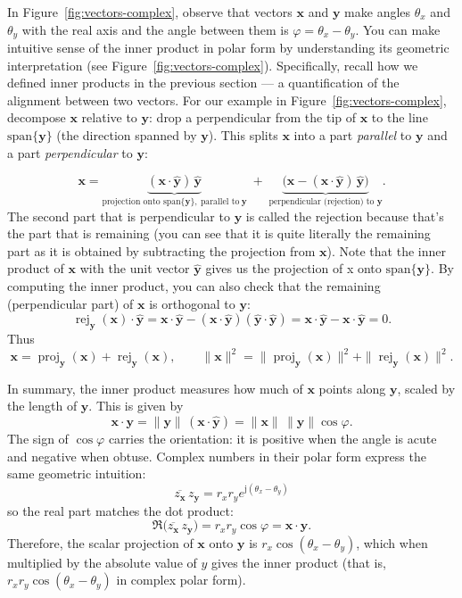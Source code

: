 \documentclass{ee102_notes}
\begin{document}
In Figure~\ref{fig:vectors-complex}, observe that vectors $\mathbf{x}$ and $\mathbf{y}$ make angles $\theta_x$ and $\theta_y$ with the real axis and the angle between them is $\varphi=\theta_x-\theta_y$. You can make intuitive sense of the inner product in polar form by understanding its geometric interpretation (see Figure~\ref{fig:vectors-complex}). Specifically, recall how we defined inner products in the previous section --- a quantification of the alignment between two vectors. For our example in Figure~\ref{fig:vectors-complex}, decompose $\mathbf{x}$ relative to $\mathbf{y}$: drop a perpendicular from the tip of $\mathbf{x}$ to the line $\mathrm{span}\{\mathbf{y}\}$ (the direction spanned by $\mathbf{y}$). This splits $\mathbf{x}$ into a part \emph{parallel} to $\mathbf{y}$ and a part \emph{perpendicular} to $\mathbf{y}$:
   
\[
\mathbf{x}
=\underbrace{(\mathbf{x}\cdot\hat{\mathbf{y}})\,\hat{\mathbf{y}}}_{\text{projection onto }\mathrm{span}\{\mathbf y\}, \: \text{parallel to} \: \mathbf y}
\;+\;
\underbrace{\Big(\mathbf{x}-(\mathbf{x}\cdot\hat{\mathbf{y}})\,\hat{\mathbf{y}}\Big)}_{\text{perpendicular (rejection) to }\mathbf y}.
\]
The second part that is perpendicular to $\mathbf y$ is called the rejection because that's the part that is remaining (you can see that it is quite literally the remaining part as it is obtained by subtracting the projection from $\mathbf{x}$). Note that the inner product of $\mathbf{x}$ with the unit vector $\hat{\mathbf{y}}$ gives us the projection of x onto $\mathrm{span}\{\mathbf{y}\}$. By computing the inner product, you can also check that the remaining (perpendicular part) of $\mathbf{x}$ is orthogonal to $\mathbf{y}$:
\[
\operatorname{rej}_{\mathbf y}(\mathbf x)\cdot \hat{\mathbf y}
=\mathbf x\!\cdot\!\hat{\mathbf y}-(\mathbf x\!\cdot\!\hat{\mathbf y})(\hat{\mathbf y}\!\cdot\!\hat{\mathbf y})
=\mathbf x\!\cdot\!\hat{\mathbf y}-\mathbf x\!\cdot\!\hat{\mathbf{y}}=0.
\]
Thus
\[
\mathbf x=\operatorname{proj}_{\mathbf y}(\mathbf x)+\operatorname{rej}_{\mathbf y}(\mathbf x),
\qquad
\|\mathbf x\|^2=\|\operatorname{proj}_{\mathbf y}(\mathbf x)\|^2+\|\operatorname{rej}_{\mathbf y}(\mathbf x)\|^2.
\]

In summary, the inner product measures how much of $\mathbf{x}$ points along $\mathbf{y}$, scaled by the length of $\mathbf{y}$. This is given by
    \[
      \mathbf{x}\cdot\mathbf{y}
      = \|\mathbf{y}\|\,(\mathbf{x}\cdot\hat{\mathbf{y}})
      = \|\mathbf{x}\|\,\|\mathbf{y}\|\cos\varphi.
    \]
The sign of $\cos\varphi$ carries the orientation: it is positive when the angle is acute and negative when obtuse. Complex numbers in their polar form express the same geometric intuition:
\[
      \overline{z_{\mathbf{x}}}\,z_{\mathbf{y}}
      = r_x r_y e^{\mathrm{j}(\theta_x-\theta_y)}
\]
so the real part matches the dot product:
\[
  \Re\!\big(\overline{z_{\mathbf{x}}}\,z_{\mathbf{y}}\big)
  = r_x r_y \cos\varphi
  = \mathbf{x}\cdot\mathbf{y}.
\]
Therefore, the scalar projection of $\textbf{x}$ onto $\textbf{y}$ is $r_x \cos(\theta_x - \theta_y)$, which when multiplied by the absolute value of $y$ gives the inner product (that is, $r_xr_y\cos(\theta_x - \theta_y)$ in complex polar form). 
\end{document}
